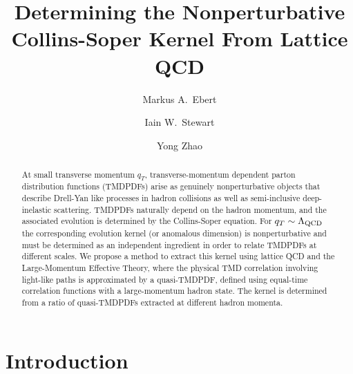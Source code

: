 \documentclass[prd,aps,twocolumn,bibnotes,nofootinbib,preprintnumbers,floatfix]{revtex4-1}
\newcommand{\LQCD}{\Lambda_{\rm QCD}}
\begin{document}

\title{Determining the Nonperturbative Collins-Soper Kernel From Lattice QCD}

\author{Markus A.~Ebert}
\author{Iain W.~Stewart}
\author{Yong Zhao}


\begin{abstract}

At small transverse momentum $q_T$, transverse-momentum dependent parton distribution functions (TMDPDFs) arise as 
genuinely nonperturbative 
objects that describe Drell-Yan like processes in hadron collisions as well as semi-inclusive deep-inelastic scattering.
TMDPDFs naturally depend on the hadron momentum, and the associated evolution is determined by the Collins-Soper equation.
For $q_T \sim \LQCD$ the corresponding evolution kernel (or anomalous dimension) is nonperturbative and must be determined as an independent ingredient in order to relate TMDPDFs at different  scales.
We propose a method to extract this kernel using lattice QCD and the Large-Momentum Effective Theory, where the physical TMD correlation involving light-like paths is approximated by a quasi-TMDPDF, defined using equal-time correlation functions with a large-momentum hadron state.
The kernel is determined from a ratio of quasi-TMDPDFs extracted at different hadron momenta.

\end{abstract}

\maketitle


\section{Introduction}
\end{document}
